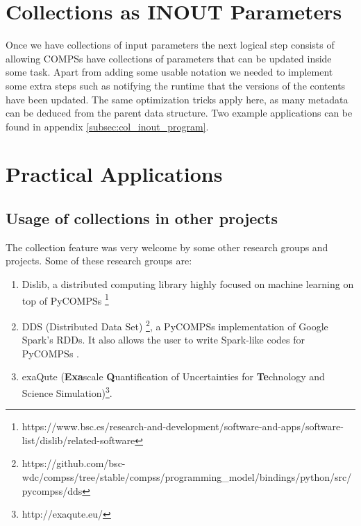 \section{Collections as INOUT Parameters}
\label{subsec:col_inout}

Once we have collections of input parameters the next logical step consists of allowing COMPSs have collections of parameters that can be updated inside some task. Apart from adding some usable notation we needed to implement some extra steps such as notifying the runtime that the versions of the contents have been updated. The same optimization tricks apply here, as many metadata can be deduced from the parent data structure. Two example applications can be found in appendix \ref{subsec:col_inout_program}.

\section{Practical Applications}
\label{subsec:col_examples}

\subsection{Usage of collections in other projects}
\label{subsubsec:col_projects}
The collection feature was very welcome by some other research groups and projects. Some of these research groups are:

\begin{enumerate}
    \item Dislib, a distributed computing library highly focused on machine learning on top of PyCOMPSs \footnote{https://www.bsc.es/research-and-development/software-and-apps/software-list/dislib/related-software}
    \item DDS (Distributed Data Set) \footnote{https://github.com/bsc-wdc/compss/tree/stable/compss/programming\_model/bindings/python/src/pycompss/dds}, a PyCOMPSs implementation of Google Spark's RDDs. It also allows the user to write Spark-like codes for PyCOMPSs .
    \item exaQute (\textbf{Exa}scale \textbf{Q}uantification of Uncertainties for \textbf{Te}chnology and Science Simulation)\footnote{http://exaqute.eu/}. 
\end{enumerate}